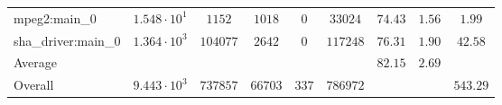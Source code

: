 \begin{tabular}{|l|c|c|c|c|c|c|c|c|}
mpeg2:main\_0           & $ 1.548 \cdot 10^{1} $ & $ 1152   $ & $ 1018  $ & $ 0   $ & $ 33024  $ & $ 74.43       $ & $ 1.56    $ & $ 1.99    $ \\
sha\_driver:main\_0     & $ 1.364 \cdot 10^{3} $ & $ 104077 $ & $ 2642  $ & $ 0   $ & $ 117248 $ & $ 76.31       $ & $ 1.90    $ & $ 42.58   $ \\
\hline
Average                 & $                    $ & $        $ & $       $ & $     $ & $        $ & $ 82.15       $ & $ 2.69    $ & $         $ \\
\hline
Overall                 & $ 9.443 \cdot 10^{3} $ & $ 737857 $ & $ 66703 $ & $ 337 $ & $ 786972 $ & $             $ & $         $ & $ 543.29  $ \\
\hline
\end{tabular}

